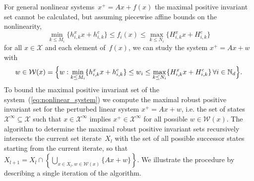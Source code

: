 \documentclass[smallextended]{svjour3}       %
\numberwithin{equation}{section}
\begin{document}
For general nonlinear systems~$x^+=Ax + f(x)$ the maximal positive invariant set cannot be calculated, but assuming piecewise affine bounds on the nonlinearity,
\[
\min_{k\leq M_i}\{h_{i,k}^x x + h_{i,k}^c\}\leq f_i(x)\leq\max_{k\leq N_i}\{H_{i,k}^x x + H_{i,k}^c\}
\] 
for all $x\in\mathcal X$ and each element of~$f(x)$,
%
we can study the system $x^+=Ax+w$ with 
\[
w\in\mathcal W(x) = \Bigl\{w:\min_{k\leq M_i}\{h_{i,k}^x x + h_{i,k}^c\}\leq w_i\leq\max_{k\leq N_i}\{H_{i,k}^x x + H_{i,k}^c\}\,\forall i\in\mathbb N_d\Bigr\}.
\]
%
To bound the maximal positive invariant set of the system~(\ref{eq:nonlinear_system}) we compute the maximal robust positive invariant set for the perturbed linear system $x^+=Ax+w$, i.e. the set of states~$\mathscr X^\infty\subseteq\mathcal X$ such that $x\in\mathscr X^\infty$ implies $x^+\in\mathscr X^\infty$ for all possible $w\in\mathcal W(x)$.
%
The algorithm to determine the maximal robust positive invariant sets recursively intersects the current set iterate~$X_l$ with the set of all possible successor states starting from the current iterate, so that $X_{l+1}=X_l\cap\left\{\bigcup_{x\in X_l,w\in\mathcal W(x)}\{Ax+w\}\right\}$.
%
We illustrate the procedure by describing a single iteration of the algorithm.
%
\end{document}

